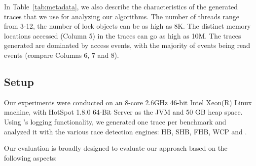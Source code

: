 In Table~\ref{tab:metadata}, we also describe the characteristics of
the generated traces that we use for analyzing our algorithms.  The
number of threads range from 3-12, the number of lock objects can be
as high as 8K.  The distinct memory locations accessed (Column 5) in
the traces can go as high as 10M.  The traces generated are dominated
by access events, with the majority of events being read events
(compare Columns 6, 7 and 8).

\subsection{Setup}
 
Our experiments were conducted on an 8-core 2.6GHz 46-bit Intel
Xeon(R) Linux machine, with HotSpot 1.8.0 64-Bit Server as the JVM and
50 GB heap space.  Using \rvpredict's logging functionality, we
generated one trace per benchmark and analyzed it with the various race
detection engines: HB, SHB, FHB, WCP and \rvpredict.

Our evaluation is broadly designed to evaluate our approach
based on the following aspects:

